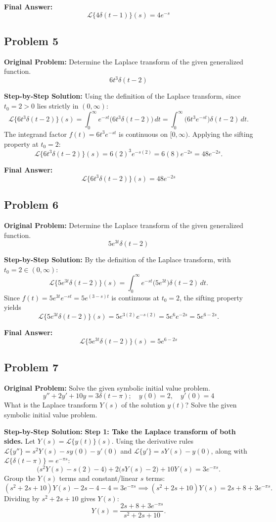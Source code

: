 \documentclass[11pt, letterpaper]{article}
\theoremstyle{definition}
\theoremstyle{remark}
\begin{document}
\textbf{Final Answer:}
\[
    \mathcal{L}\{4\delta(t - 1)\}(s) = 4e^{-s}
\]

\subsection{Problem 5}
\textbf{Original Problem:}
Determine the Laplace transform of the given generalized function.
\[
    6t^3\delta(t - 2)
\]

\textbf{Step-by-Step Solution:}
Using the definition of the Laplace transform, since $t_0 = 2 > 0$ lies strictly in $(0, \infty)$:
\[
    \mathcal{L}\{6t^3\delta(t - 2)\}(s) = \int_{0}^{\infty} e^{-st} \bigl(6t^3\delta(t - 2)\bigr)\,dt = \int_{0}^{\infty} \bigl(6t^3 e^{-st}\bigr)\delta(t - 2)\,dt.
\]
The integrand factor $f(t) = 6t^3 e^{-st}$ is continuous on $[0, \infty)$. Applying the sifting property at $t_0 = 2$:
\[
    \mathcal{L}\{6t^3\delta(t - 2)\}(s) = 6(2)^3 e^{-s(2)} = 6(8)e^{-2s} = 48e^{-2s}.
\]

\textbf{Final Answer:}
\[
    \mathcal{L}\{6t^3\delta(t - 2)\}(s) = 48e^{-2s}
\]

\subsection{Problem 6}
\textbf{Original Problem:}
Determine the Laplace transform of the given generalized function.
\[
    5e^{3t}\delta(t - 2)
\]

\textbf{Step-by-Step Solution:}
By the definition of the Laplace transform, with $t_0 = 2 \in (0, \infty)$:
\[
    \mathcal{L}\{5e^{3t}\delta(t - 2)\}(s) = \int_{0}^{\infty} e^{-st}\bigl(5e^{3t}\bigr)\delta(t - 2)\,dt.
\]
Since $f(t) = 5e^{3t}e^{-st} = 5e^{(3-s)t}$ is continuous at $t_0 = 2$, the sifting property yields
\[
    \mathcal{L}\{5e^{3t}\delta(t - 2)\}(s) = 5e^{3(2)}e^{-s(2)} = 5e^{6}e^{-2s} = 5e^{6 - 2s}.
\]

\textbf{Final Answer:}
\[
    \mathcal{L}\{5e^{3t}\delta(t - 2)\}(s) = 5e^{6 - 2s}
\]

\subsection{Problem 7}
\textbf{Original Problem:}
Solve the given symbolic initial value problem.
\[
    y'' + 2y' + 10y = 3\delta(t - \pi); \quad y(0) = 2,\quad y'(0) = 4
\]
What is the Laplace transform $Y(s)$ of the solution $y(t)$? Solve the given symbolic initial value problem.

\textbf{Step-by-Step Solution:}
\textbf{Step 1: Take the Laplace transform of both sides.}
Let $Y(s) = \mathcal{L}\{y(t)\}(s)$. Using the derivative rules $\mathcal{L}\{y''\} = s^2 Y(s) - sy(0) - y'(0)$ and $\mathcal{L}\{y'\} = sY(s) - y(0)$, along with $\mathcal{L}\{\delta(t - \pi)\} = e^{-\pi s}$:
\[
    \bigl(s^2 Y(s) - s(2) - 4\bigr) + 2\bigl(sY(s) - 2\bigr) + 10Y(s) = 3e^{-\pi s}.
\]
Group the $Y(s)$ terms and constant/linear $s$ terms:
\[
    (s^2 + 2s + 10)Y(s) - 2s - 4 - 4 = 3e^{-\pi s} \implies (s^2 + 2s + 10)Y(s) = 2s + 8 + 3e^{-\pi s}.
\]
Dividing by $s^2 + 2s + 10$ gives $Y(s)$:
\[
    Y(s) = \frac{2s + 8 + 3e^{-\pi s}}{s^2 + 2s + 10}.
\]
\end{document}
